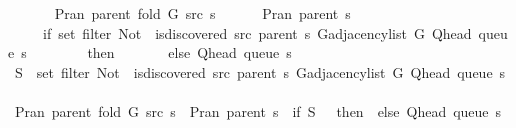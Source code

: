 \begin{isabellebody}
\ \ \isanewline
\ \ \ \ {\isachardoublequoteopen}P{\isachardot}{\kern0pt}ran\ {\isacharparenleft}{\kern0pt}parent\ {\isacharparenleft}{\kern0pt}fold\ G\ src\ s{\isacharparenright}{\kern0pt}{\isacharparenright}{\kern0pt}\ {\isacharequal}{\kern0pt}\isanewline
\ \ \ \ \ P{\isachardot}{\kern0pt}ran\ {\isacharparenleft}{\kern0pt}parent\ s{\isacharparenright}{\kern0pt}\ {\isasymunion}\isanewline
\ \ \ \ \ {\isacharparenleft}{\kern0pt}if\ set\ {\isacharparenleft}{\kern0pt}filter\ {\isacharparenleft}{\kern0pt}Not\ {\isasymcirc}\ is{\isacharunderscore}{\kern0pt}discovered\ src\ {\isacharparenleft}{\kern0pt}parent\ s{\isacharparenright}{\kern0pt}{\isacharparenright}{\kern0pt}\ {\isacharparenleft}{\kern0pt}G{\isachardot}{\kern0pt}adjacency{\isacharunderscore}{\kern0pt}list\ G\ {\isacharparenleft}{\kern0pt}Q{\isacharunderscore}{\kern0pt}head\ {\isacharparenleft}{\kern0pt}queue\ s{\isacharparenright}{\kern0pt}{\isacharparenright}{\kern0pt}{\isacharparenright}{\kern0pt}{\isacharparenright}{\kern0pt}\ {\isacharequal}{\kern0pt}\ {\isacharbraceleft}{\kern0pt}{\isacharbraceright}{\kern0pt}\isanewline
\ \ \ \ \ \ then\ {\isacharbraceleft}{\kern0pt}{\isacharbraceright}{\kern0pt}\isanewline
\ \ \ \ \ \ else\ {\isacharbraceleft}{\kern0pt}Q{\isacharunderscore}{\kern0pt}head\ {\isacharparenleft}{\kern0pt}queue\ s{\isacharparenright}{\kern0pt}{\isacharbraceright}{\kern0pt}{\isacharparenright}{\kern0pt}{\isachardoublequoteclose}\isanewline
%
\isadelimproof
%
\endisadelimproof
%
\isatagproof
{}\isamarkupfalse%
\isanewline
\ \ \isamarkupfalse%
\ {\isacharquery}{\kern0pt}S\ {\isacharequal}{\kern0pt}\ {\isachardoublequoteopen}set\ {\isacharparenleft}{\kern0pt}filter\ {\isacharparenleft}{\kern0pt}Not\ {\isasymcirc}\ is{\isacharunderscore}{\kern0pt}discovered\ src\ {\isacharparenleft}{\kern0pt}parent\ s{\isacharparenright}{\kern0pt}{\isacharparenright}{\kern0pt}\ {\isacharparenleft}{\kern0pt}G{\isachardot}{\kern0pt}adjacency{\isacharunderscore}{\kern0pt}list\ G\ {\isacharparenleft}{\kern0pt}Q{\isacharunderscore}{\kern0pt}head\ {\isacharparenleft}{\kern0pt}queue\ s{\isacharparenright}{\kern0pt}{\isacharparenright}{\kern0pt}{\isacharparenright}{\kern0pt}{\isacharparenright}{\kern0pt}{\isachardoublequoteclose}\isanewline
\ \ \isamarkupfalse%
\ {\isachardoublequoteopen}P{\isachardot}{\kern0pt}ran\ {\isacharparenleft}{\kern0pt}parent\ {\isacharparenleft}{\kern0pt}fold\ G\ src\ s{\isacharparenright}{\kern0pt}{\isacharparenright}{\kern0pt}\ {\isasymsubseteq}\ P{\isachardot}{\kern0pt}ran\ {\isacharparenleft}{\kern0pt}parent\ s{\isacharparenright}{\kern0pt}\ {\isasymunion}\ {\isacharparenleft}{\kern0pt}if\ {\isacharquery}{\kern0pt}S\ {\isacharequal}{\kern0pt}\ {\isacharbraceleft}{\kern0pt}{\isacharbraceright}{\kern0pt}\ then\ {\isacharbraceleft}{\kern0pt}{\isacharbraceright}{\kern0pt}\ else\ {\isacharbraceleft}{\kern0pt}Q{\isacharunderscore}{\kern0pt}head\ {\isacharparenleft}{\kern0pt}queue\ s{\isacharparenright}{\kern0pt}{\isacharbraceright}{\kern0pt}{\isacharparenright}{\kern0pt}{\isachardoublequoteclose}\isanewline

\end{isabellebody}
